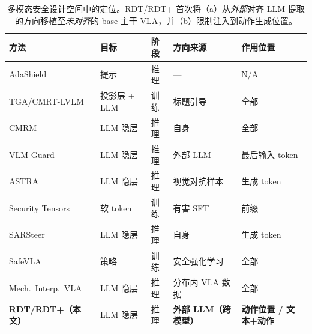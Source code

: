 \begin{table}[t]
\centering\small
\setlength{\tabcolsep}{5pt}
\begin{tabular}{p{4.4cm}p{2.0cm}p{0.8cm}p{2.8cm}p{2.4cm}}
\toprule
方法 & 目标 & 阶段 & 方向来源 & 作用位置 \\
\midrule
AdaShield \cite{adashield2024}        & 提示             & 推理 & ---               & N/A \\
TGA/CMRT-LVLM \cite{cmrt2025}         & 投影层 + LLM     & 训练 & 标题引导          & 全部 \\
CMRM \cite{cmrm2025}                  & LLM 隐层         & 推理 & 自身              & 全部 \\
VLM-Guard \cite{vlmguard2025}         & LLM 隐层         & 推理 & 外部 LLM          & 最后输入 token \\
ASTRA \cite{astra2025}                & LLM 隐层         & 推理 & 视觉对抗样本      & 生成 token \\
Security Tensors \cite{securitytensors2025} & 软 token    & 训练 & 有害 SFT          & 前缀 \\
SARSteer \cite{sarsteer2025}          & LLM 隐层         & 推理 & 自身              & 生成 token \\
SafeVLA \cite{safevla2025}            & 策略             & 训练 & 安全强化学习      & 全部 \\
Mech.\ Interp.\ VLA \cite{mechinterpvla2025} & LLM 隐层 & 推理 & 分布内 VLA 数据   & 全部 \\
\textbf{RDT/RDT+（本文）}             & LLM 隐层         & 推理 & \textbf{外部 LLM（跨模型）} & \textbf{动作位置 / 文本+动作} \\
\bottomrule
\end{tabular}
\caption{多模态安全设计空间中的定位。RDT/RDT+ 首次将（a）从\emph{外部}对齐 LLM 提取的方向移植至\emph{未对齐}的 base 主干 VLA，并（b）限制注入到动作生成位置。}
\label{tab:positioning_zh}
\end{table}
